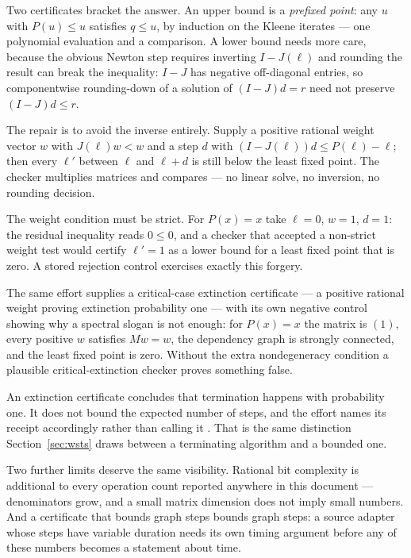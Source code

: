 Two certificates bracket the answer. An upper bound is a \emph{prefixed
point}: any $u$ with $P(u)\le u$ satisfies $q\le u$, by induction on the
Kleene iterates --- one polynomial evaluation and a comparison. A lower bound
needs more care, because the obvious Newton step requires inverting
$I-J(\ell)$ and rounding the result can break the inequality: $I-J$ has
negative off-diagonal entries, so componentwise rounding-down of a solution of
$(I-J)d=r$ need not preserve $(I-J)d\le r$.

The repair is to avoid the inverse entirely. Supply a positive rational weight
vector $w$ with $J(\ell)w<w$ and a step $d$ with $(I-J(\ell))d\le
P(\ell)-\ell$; then every $\ell'$ between $\ell$ and $\ell+d$ is still below
the least fixed point. The checker multiplies matrices and compares --- no
linear solve, no inversion, no rounding decision.

\begin{remark}
The weight condition must be strict. For $P(x)=x$ take $\ell=0$, $w=1$,
$d=1$: the residual inequality reads $0\le0$, and a checker that accepted a
non-strict weight test would certify $\ell'=1$ as a lower bound for a least
fixed point that is zero. A stored rejection control exercises exactly this
forgery.
\end{remark}

The same effort supplies a critical-case extinction certificate --- a positive
rational weight proving extinction probability one --- with its own negative
control showing why a spectral slogan is not enough: for $P(x)=x$ the matrix is
$(1)$, every positive $w$ satisfies $Mw=w$, the dependency graph is strongly
connected, and the least fixed point is zero. Without the extra nondegeneracy
condition a plausible critical-extinction checker proves something false.

\begin{remark}
An extinction certificate concludes that termination happens with probability
one. It does not bound the expected number of steps, and the effort names its
receipt accordingly rather than calling it . That is the same
distinction Section~\ref{sec:wsts} draws between a terminating algorithm and a
bounded one.
\end{remark}

Two further limits deserve the same visibility. Rational bit complexity is
additional to every operation count reported anywhere in this document ---
denominators grow, and a small matrix dimension does not imply small numbers.
And a certificate that bounds graph steps bounds graph steps: a source adapter
whose steps have variable duration needs its own timing argument before any of
these numbers becomes a statement about time.
